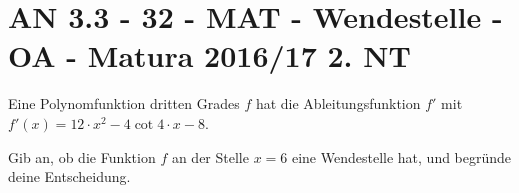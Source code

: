 \section{AN 3.3 - 32 - MAT - Wendestelle - OA - Matura 2016/17 2. NT}

\begin{beispiel}{1} %
Eine Polynomfunktion dritten Grades $f$ hat die Ableitungsfunktion $f'$ mit $f'(x)=12\cdot x^2 - 4 \cot 4 \cdot x - 8$. \leer

Gib an, ob die Funktion $f$ an der Stelle $x=6$ eine Wendestelle hat, und begründe deine Entscheidung.


\end{beispiel}